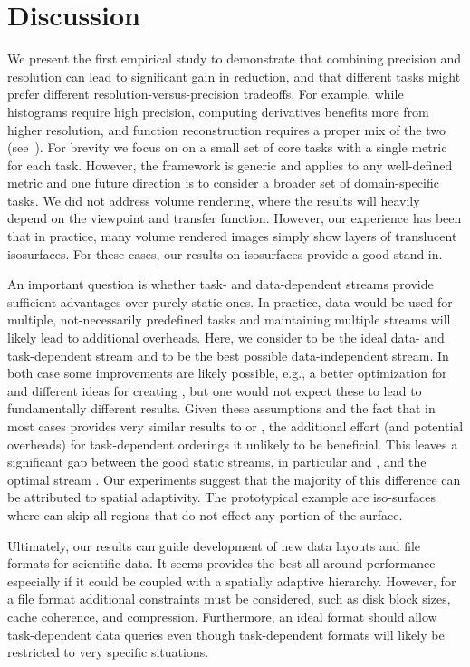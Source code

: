 \section{Discussion}

We present the first empirical study to demonstrate that combining precision and resolution can lead
to significant gain in reduction, and that different tasks might prefer different
resolution-versus-precision tradeoffs. For example, while histograms require high precision,
computing derivatives benefits more from higher resolution, and function reconstruction requires a
proper mix of the two (see~). For brevity we focus on on a small set of core
tasks with a single metric for each task. However, the framework is generic and applies to any
well-defined metric and one future direction is to consider a broader set of domain-specific tasks.
We did not address volume rendering, where the results will heavily depend on the viewpoint and
transfer function. However, our experience has been that in practice, many volume rendered images
simply show layers of translucent isosurfaces. For these cases, our results on isosurfaces provide a
good stand-in.

An important question is whether task- and data-dependent streams provide sufficient advantages over
purely static ones. In practice, data would be used for multiple, not-necessarily predefined tasks
and maintaining multiple streams will likely lead to additional overheads. Here, we consider \sopt
to be the ideal data- and task-dependent stream and \ssig to be the best possible data-independent
stream. In both case some improvements are likely possible, e.g., a better optimization for \sopt
and different ideas for creating \ssig, but one would not expect these to lead to fundamentally
different results. Given these assumptions and the fact that \ssig in most cases provides very
similar results to \sbit or \swav, the additional effort (and potential overheads) for
task-dependent orderings it unlikely to be beneficial. This leaves a significant gap between the
good static streams, in particular \swav and \sbit, and the optimal stream \sopt. Our experiments
suggest that the majority of this difference can be attributed to spatial adaptivity. The
prototypical example are iso-surfaces where \sopt can skip all regions that do not effect any
portion of the surface.

Ultimately, our results can guide development of new data layouts and file formats for scientific
data. It seems \swav provides the best all around performance especially if it could be coupled with
a spatially adaptive hierarchy. However, for a file format additional constraints must be
considered, such as disk block sizes, cache coherence, and compression. Furthermore, an ideal format
should allow task-dependent data queries even though task-dependent formats will likely be
restricted to very specific situations. 


